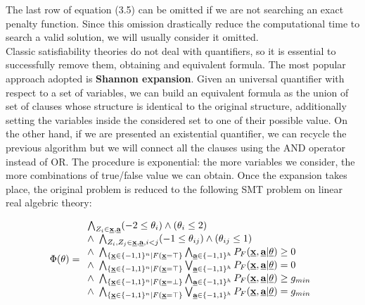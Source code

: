 The last row of equation (3.5) can be omitted if we are not searching an exact penalty function. Since this omission drastically reduce the computational time to search a valid solution, we will usually consider it omitted. \\
Classic satisfiability theories do not deal with quantifiers, so it is essential to successfully remove them, obtaining and equivalent formula. The most popular approach adopted is \textbf{Shannon expansion}. Given an universal quantifier with respect to a set of variables, we can build an equivalent formula as the union of set of clauses whose structure is identical to the original structure, additionally setting the variables inside the considered set to one of their possible value. On the other hand, if we are presented an existential quantifier, we can recycle the previous algorithm but we will connect all the clauses using the AND operator instead of OR. The procedure is exponential: the more variables we consider, the more combinations of true/false value we can obtain. Once the expansion takes place, the original problem is reduced to the following SMT problem on linear real algebric theory:

\begin{equation}
    \Phi(\theta) =
        \begin{array}{lr}
            \bigwedge_{Z_i\in\textbf{\underline{x}},\textbf{\underline{a}}}(-2\leq\theta_i) \land (\theta_i\leq 2) \\
            \land\  \bigwedge_{Z_i,Z_j\in\textbf{\underline{x}},\textbf{\underline{a}}, i<j}(-1\leq\theta_{ij}) \land (\theta_{ij}\leq 1) \\
            \land\ \bigwedge_{\{\textbf{\underline{x}}\in\{-1,1\}^n|F(\textbf{\underline{x}}=\top\}} \bigwedge_{\textbf{\underline{a}}\in\{-1,1\}^h}P_F(\underline{\textbf{x}},\underline{\textbf{a}} | \underline{\theta}) \geq 0 \\
            \land\ \bigwedge_{\{\textbf{\underline{x}}\in\{-1,1\}^n|F(\textbf{\underline{x}}=\top\}} \bigvee_{\textbf{\underline{a}}\in\{-1,1\}^h}P_F(\underline{\textbf{x}},\underline{\textbf{a}} | \underline{\theta}) = 0 \\
            \land\ \bigwedge_{\{\textbf{\underline{x}}\in\{-1,1\}^n|F(\textbf{\underline{x}}=\bot\}} \bigwedge_{\textbf{\underline{a}}\in\{-1,1\}^h}P_F(\underline{\textbf{x}},\underline{\textbf{a}} | \underline{\theta}) \geq g_{min} \\
            \land\ \bigwedge_{\{\textbf{\underline{x}}\in\{-1,1\}^n|F(\textbf{\underline{x}}=\top\}} \bigvee_{\textbf{\underline{a}}\in\{-1,1\}^h}P_F(\underline{\textbf{x}},\underline{\textbf{a}} | \underline{\theta}) = g_{min} \\
        \end{array}
\end{equation}

